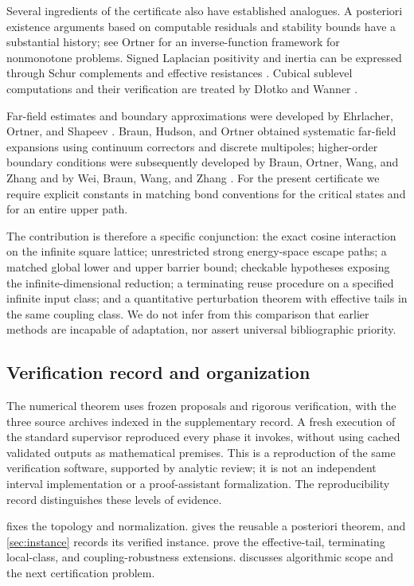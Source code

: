 Several ingredients of the certificate also have established analogues. A posteriori existence arguments based on computable residuals and stability bounds have a substantial history; see Ortner \cite{Ortner2009} for an inverse-function framework for nonmonotone problems. Signed Laplacian positivity and inertia can be expressed through Schur complements and effective resistances \cite{Chen2020}. Cubical sublevel computations and their verification are treated by D\l{}otko and Wanner \cite{Dlotko2018}.

Far-field estimates and boundary approximations were developed by Ehrlacher, Ortner, and Shapeev \cite{Ehrlacher2016}. Braun, Hudson, and Ortner \cite{Braun2022} obtained systematic far-field expansions using continuum correctors and discrete multipoles; higher-order boundary conditions were subsequently developed by Braun, Ortner, Wang, and Zhang \cite{Braun2025} and by Wei, Braun, Wang, and Zhang \cite{Wei2026}. For the present certificate we require explicit constants in matching bond conventions for the critical states and for an entire upper path.

The contribution is therefore a specific conjunction: the exact cosine interaction on the infinite square lattice; unrestricted strong energy-space escape paths; a matched global lower and upper barrier bound; checkable hypotheses exposing the infinite-dimensional reduction; a terminating reuse procedure on a specified infinite input class; and a quantitative perturbation theorem with effective tails in the same coupling class. We do not infer from this comparison that earlier methods are incapable of adaptation, nor assert universal bibliographic priority.

\subsection{Verification record and organization}

The numerical theorem uses frozen proposals and rigorous verification, with the three source archives indexed in the supplementary record. A fresh execution of the standard supervisor reproduced every phase it invokes, without using cached validated outputs as mathematical premises. This is a reproduction of the same verification software, supported by analytic review; it is not an independent interval implementation or a proof-assistant formalization. The reproducibility record distinguishes these levels of evidence.

 fixes the topology and normalization.  gives the reusable a posteriori theorem, and \cref{sec:instance} records its verified instance.  prove the effective-tail, terminating local-class, and coupling-robustness extensions.  discusses algorithmic scope and the next certification problem.
